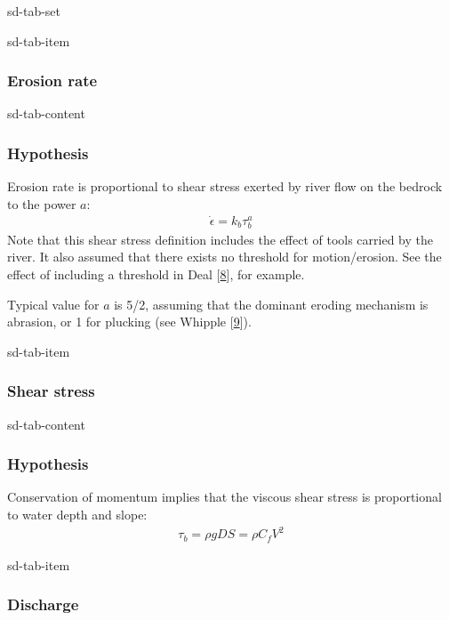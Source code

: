 \documentclass[letterpaper,10pt,english]{jupyterBook}
\begin{document}
\begin{sphinxuseclass}{sd-tab-set}
\begin{sphinxuseclass}{sd-tab-item}\subsubsection*{Erosion rate}

\begin{sphinxuseclass}{sd-tab-content}\subsubsection*{Hypothesis}

\sphinxAtStartPar
Erosion rate is proportional to shear stress exerted by river flow on the bedrock to the power \(a\):
\begin{equation*}
\begin{split}\dot\epsilon=k_b\tau_b^a\end{split}
\end{equation*}
\sphinxAtStartPar
Note that this shear stress definition includes the effect of tools carried by the river. It also assumed that there exists no threshold for motion/erosion. See the effect of including a threshold in Deal  {[}\hyperlink{cite.references:id4}{8}{]}, for example.

\sphinxAtStartPar
Typical value for \(a\) is 5/2, assuming that the dominant eroding mechanism is abrasion, or 1 for plucking (see Whipple  {[}\hyperlink{cite.references:id2}{9}{]}).

\end{sphinxuseclass}
\end{sphinxuseclass}
\begin{sphinxuseclass}{sd-tab-item}\subsubsection*{Shear stress}

\begin{sphinxuseclass}{sd-tab-content}\subsubsection*{Hypothesis}

\sphinxAtStartPar
Conservation of momentum implies that the viscous shear stress is proportional to water depth and slope:
\begin{equation*}
\begin{split}\tau_b=\rho g D S=\rho C_fV^2\end{split}
\end{equation*}
\end{sphinxuseclass}
\end{sphinxuseclass}
\begin{sphinxuseclass}{sd-tab-item}\subsubsection*{Discharge}


\end{sphinxuseclass}
\end{sphinxuseclass}
\end{document}
